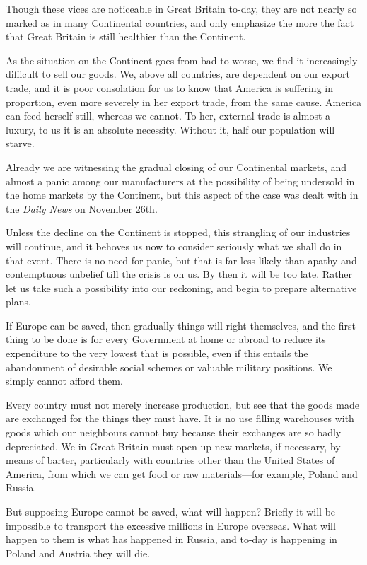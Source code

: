\documentclass{book}
\begin{document}
Though these vices are noticeable in Great Britain to-day, they are not nearly so marked as in many Continental countries, and only emphasize the more the fact that Great Britain is still healthier than the Continent.

As the situation on the Continent goes from bad to worse, we find it increasingly difficult to sell our goods. We, above all countries, are dependent on our export trade, and it is poor consolation for us to know that America is suffering in proportion, even more severely in her export trade, from the same cause. America can feed herself still, whereas we cannot. To her, external trade is almost a luxury, to us it is an absolute necessity. Without it, half our population will starve.

Already we are witnessing the gradual closing of our Continental markets, and almost a panic among our manufacturers at the possibility of being undersold in the home markets by the Continent, but this aspect of the case was dealt with in the \emph{Daily News} on November 26th.

Unless the decline on the Continent is stopped, this strangling of our industries will continue, and it behoves us now to consider seriously what we shall do in that event. There is no need for panic, but that is far less likely than apathy and contemptuous unbelief till the crisis is on us. By then it will be too late. Rather let us take such a possibility into our reckoning, and begin to prepare alternative plans.

If Europe can be saved, then gradually things will right themselves, and the first thing to be done is for every Government at home or abroad to reduce its expenditure to the very lowest that is possible, even if this entails the abandonment of desirable social schemes or valuable military positions. We simply cannot afford them.

Every country must not merely increase production, but see that the goods made are exchanged for the things they must have. It is no use filling warehouses with goods which our neighbours cannot buy because their exchanges are so badly depreciated. We in Great Britain must open up new markets, if necessary, by means of barter, particularly with countries other than the United States of America, from which we can get food or raw materials—for example, Poland and Russia.

But supposing Europe cannot be saved, what will happen? Briefly it will be impossible to transport the excessive millions in Europe overseas. What will happen to them is what has happened in Russia, and to-day is happening in Poland and Austria they will die.
\end{document}
